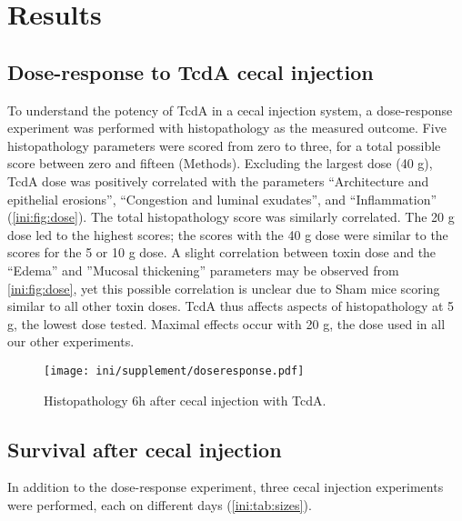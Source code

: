 \section{Results}

\subsection{Dose-response to TcdA cecal injection}

To understand the potency of TcdA in a cecal injection system, a dose-response
experiment was performed with histopathology as the measured outcome.
Five histopathology parameters were scored from zero to three, for a total possible score
between zero and fifteen (Methods). Excluding the largest dose (40 \textmugreek{}g),
TcdA dose was positively correlated with the parameters ``Architecture and epithelial erosions'', 
``Congestion and luminal exudates'', and
``Inflammation'' (\autoref{ini:fig:dose}). The total histopathology score was similarly correlated.
The 20 \textmugreek{}g dose led to the highest scores; the scores with
the 40 \textmugreek{}g dose were similar to the scores for the 5 or 10 \textmugreek{}g dose.
A slight correlation between toxin dose and the ``Edema'' and ''Mucosal thickening''
parameters may be observed from \autoref{ini:fig:dose}, yet this possible
correlation is unclear due to Sham mice scoring similar to all other toxin doses.
TcdA thus affects aspects of histopathology at 5 \textmugreek{}g, the lowest
dose tested. Maximal effects occur with 20 \textmugreek{}g, the dose used in all our
other experiments.

\begin{figure}
\centering
\texttt{[image: ini/supplement/doseresponse.pdf]}
\caption{Histopathology 6h after cecal injection with TcdA.}
\label{ini:fig:dose}
\end{figure}

\subsection{Survival after cecal injection}

In addition to the dose-response experiment, three cecal injection experiments were performed, each on
different days (\autoref{ini:tab:sizes}). 

